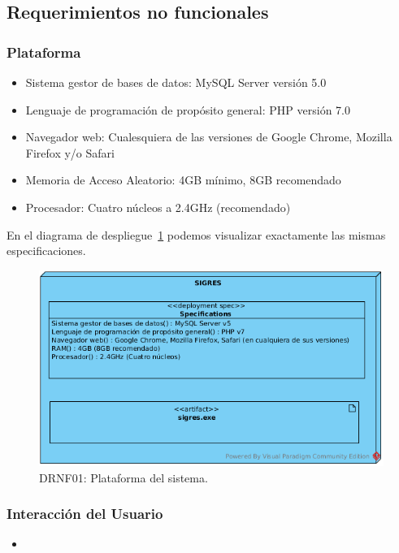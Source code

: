 \subsection{Requerimientos no funcionales}
\subsubsection{Plataforma}
\begin{itemize}
    \item {Sistema gestor de bases de datos: MySQL Server  versión 5.0}
    \item {Lenguaje de programación de propósito general: PHP versión 7.0}
    \item {Navegador web: Cualesquiera de las versiones de Google Chrome, Mozilla Firefox y/o Safari}
    \item {Memoria de Acceso Aleatorio: 4GB mínimo, 8GB recomendado}
    \item {Procesador: Cuatro núcleos a 2.4GHz (recomendado)}
\end{itemize}

En el diagrama de despliegue~\ref{fig:plataforma} podemos visualizar exactamente las mismas especificaciones.
\begin{figure}[H]
    \centering
    \includegraphics[scale=.7]{images/plataforma.png}
    \centering
    \caption{DRNF01: Plataforma del sistema.}
    \label{fig:plataforma}
\end{figure}

\subsubsection{Interacción del Usuario}
\begin{itemize}
    \item {}
\end{itemize}


